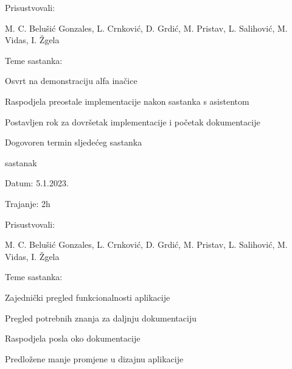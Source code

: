 \begin{packed_enum}
\begin{packed_item}
	
	\item Prisustvovali: \begin{packed_enum}
		
		\item[]  M. C. Belušić Gonzales,
		L. Crnković,
		D. Grdić,
		M. Pristav,
		L. Salihović,
		M. Vidas,
		I. Žgela
	\end{packed_enum}
	\item Teme sastanka:
	\begin{packed_item}
		\item Osvrt na demonstraciju alfa inačice
		\item Raspodjela preostale implementacije nakon sastanka s asistentom
		\item Postavljen rok za dovršetak implementacije i početak dokumentacije
		\item Dogovoren termin sljedećeg sastanka
		
	\end{packed_item}
\end{packed_item}
	\item  sastanak
\item[] \begin{packed_item}
	\item Datum: 5.1.2023.
	\item Trajanje: 2h
	
	
	\item Prisustvovali: \begin{packed_enum}
		
		\item[]  M. C. Belušić Gonzales,
		L. Crnković,
		D. Grdić,
		M. Pristav,
		L. Salihović,
		M. Vidas,
		I. Žgela
	\end{packed_enum}
	\item Teme sastanka:
	\begin{packed_item}
		\item Zajednički pregled funkcionalnosti aplikacije
		\item Pregled potrebnih znanja za daljnju dokumentaciju
		\item Raspodjela posla oko dokumentacije
		\item Predložene manje promjene u dizajnu aplikacije
		
		
	\end{packed_item}
\end{packed_item}



%

\end{packed_enum}

